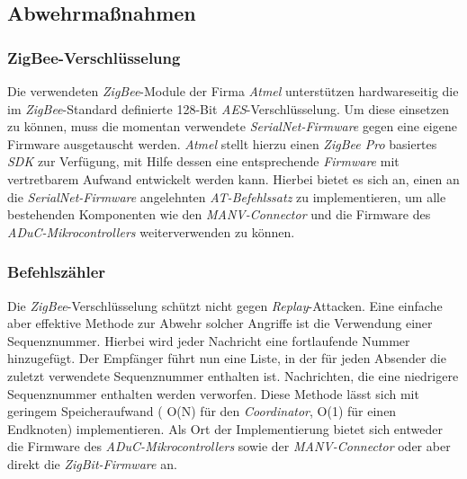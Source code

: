 \subsection{Abwehrmaßnahmen}

\subsubsection{ZigBee-Verschlüsselung}
Die verwendeten \emph{ZigBee}-Module der Firma \emph{Atmel} unterstützen hardwareseitig die im 
\emph{ZigBee}-Standard definierte 128-Bit 
\emph{AES}-Verschlüsselung. Um diese einsetzen zu können, muss die momentan verwendete \emph{SerialNet-Firmware}
gegen eine eigene Firmware ausgetauscht werden. \emph{Atmel} stellt hierzu einen \emph{ZigBee Pro} basiertes 
\emph{SDK} zur Verfügung, mit Hilfe dessen eine entsprechende \emph{Firmware} mit vertretbarem Aufwand entwickelt 
werden kann. Hierbei bietet es sich an, einen an die \emph{SerialNet-Firmware} angelehnten \emph{AT-Befehlssatz} zu 
implementieren, um alle bestehenden Komponenten wie den \emph{MANV-Connector} und die Firmware des 
\emph{ADuC-Mikrocontrollers} weiterverwenden zu können.

\subsubsection{Befehlszähler}
Die \emph{ZigBee}-Verschlüsselung schützt nicht gegen \emph{Replay}-Attacken. Eine einfache aber effektive Methode 
zur Abwehr solcher
Angriffe ist die Verwendung einer Sequenznummer. Hierbei wird jeder Nachricht eine fortlaufende Nummer hinzugefügt. 
Der Empfänger führt nun eine Liste, in der für jeden Absender die zuletzt verwendete Sequenznummer enthalten ist.
Nachrichten, die eine niedrigere Sequenznummer enthalten werden verworfen. Diese Methode lässt sich mit geringem
Speicheraufwand ( O(N) für den \emph{Coordinator}, O(1) für einen Endknoten) implementieren. Als Ort der Implementierung
bietet sich entweder die Firmware des \emph{ADuC-Mikrocontrollers} sowie der \emph{MANV-Connector} oder aber direkt 
die \emph{ZigBit-Firmware} an.

